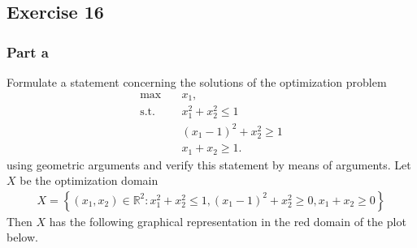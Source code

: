 \subsection{Exercise 16}
\subsubsection{Part a}
Formulate a statement concerning the solutions of the optimization problem
\begin{align}
    \text{max}\quad & x_1,\\
    \text{s.t.}\quad & x_1^{2} + x_2^{2} \le 1 \nonumber\\
    &(x_1 - 1)^{2} + x_2^{2} \ge 1 \nonumber\\
    &x_1 + x_2 \ge 1\nonumber.
\end{align}
using geometric arguments and verify this statement by means of arguments.
\newline
Let $X$ be the optimization domain
\begin{align}
    X = \left\{ \left( x_1, x_2 \right) \in \mathbb{R}^{2}: x_1^{2}+x_2^{2}
    \le 1, (x_1 -1)^{2} + x_2^{2} \ge 0 , x_1 +x_2 \ge 0  \right\}
\end{align}
Then $X$ has the following graphical representation in the red domain of the
plot below.
